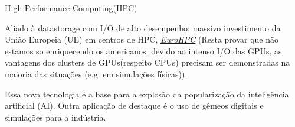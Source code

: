 \documentclass{beamer}
\begin{document}
\begin{frame}{High Performance Computing(HPC)}
		\vspace{0.3cm}
		
		Aliado à datastorage com I/O de alto desempenho: massivo investimento da União Europeia (UE) em centros de HPC, \textcolor{blue}{\emph{\href{https://eurohpc-ju.europa.eu/index_en}{EuroHPC}}}
		(Resta provar que não estamos so enriquecendo os americanos: devido ao intenso I/O das GPUs, as vantagens dos clusters de GPUs(respeito CPUs) precisam ser demonstradas na maioria das situações (e.g. em simulações físicas)).
		
		\vspace{0.3cm}
		Essa nova tecnologia é a base para a explosão da popularização da inteligência artificial (AI). Outra aplicação de destaque é o uso de gêmeos digitais e simulações para a indústria.
		

	\end{frame}
	
\end{document}
